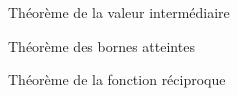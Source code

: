 \documentclass[french,t,handout,xcolor=svgnames]{beamer}
\begin{document}
\begin{frame}{Théorème de la valeur intermédiaire}
  
\end{frame}
\begin{frame}{Théorème des bornes atteintes}

\end{frame}
\begin{frame}{Théorème de la fonction réciproque}
\end{frame}


\end{document}
